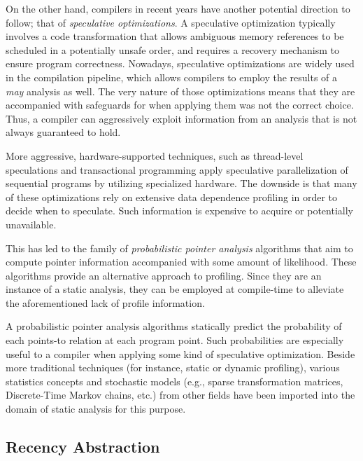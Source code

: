 On the other hand, compilers in recent years have another potential direction to follow; that of \emph{speculative optimizations}. A speculative optimization typically involves a code transformation that allows ambiguous memory references to be scheduled in a potentially unsafe order, and requires a recovery mechanism to ensure program correctness. Nowadays, speculative optimizations are widely used in the compilation pipeline, which allows compilers to employ the results of a \emph{may} analysis as well. The very nature of those optimizations means that they are accompanied with safeguards for when applying them was not the correct choice. Thus, a compiler can aggressively exploit information from an analysis that is not always guaranteed to hold.

More aggressive, hardware-supported techniques, such as thread-level speculations \cite{asplos:1998:Hammond,article:1999:Krishnan,hpca:2001:Roth} and transactional programming \cite{article:2004:Hammond,asplos:1998:Hammond} apply speculative parallelization of sequential programs by utilizing specialized hardware. The downside is that many of these optimizations rely on extensive data dependence profiling in order to decide when to speculate. Such information is expensive to acquire or potentially unavailable.

This has led to the family of \emph{probabilistic pointer analysis} algorithms \cite{asplos:2006:Silva,aplas:2007:DiPierro,article:2004:PengSheng} that aim to compute pointer information accompanied with some amount of likelihood. These algorithms provide an alternative approach to profiling. Since they are an instance of a static analysis, they can be employed at compile-time to alleviate the aforementioned lack of profile information.

A probabilistic pointer analysis algorithms statically predict the probability of each points-to relation at each program point. Such probabilities are especially useful to a compiler when applying some kind of speculative optimization. Beside more traditional techniques (for instance, static or dynamic profiling), various statistics concepts and stochastic models (e.g., sparse transformation matrices, Discrete-Time Markov chains, etc.) from other fields have been imported into the domain of static analysis for this purpose.


\subsection{Recency Abstraction}

